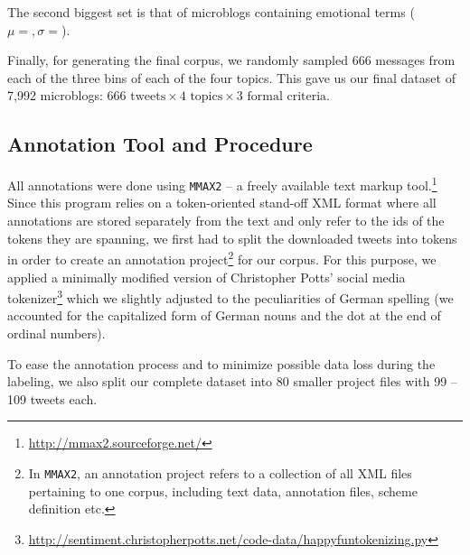 The second biggest set is that of microblogs containing emotional
terms ($\mu=, \sigma=$).

Finally, for generating the final corpus, we randomly sampled 666
messages from each of the three bins of each of the four topics. This
gave us our final dataset of 7,992 microblogs: $666\text{ tweets}
\times 4\text{ topics} \times 3\text{ formal criteria}$.

\subsection{Annotation Tool and Procedure}\label{subsec:snt:tformat}

All annotations were done using \texttt{MMAX2} -- a freely available
text markup tool.\footnote{\url{http://mmax2.sourceforge.net/}} Since
this program relies on a token-oriented stand-off XML format where all
annotations are stored separately from the text and only refer to the
ids of the tokens they are spanning, we first had to split the
downloaded tweets into tokens in order to create an annotation
project\footnote{In \texttt{MMAX2}, an annotation project refers to a
  collection of all XML files pertaining to one corpus, including text
  data, annotation files, scheme definition etc.}  for our corpus.
For this purpose, we applied a minimally modified version of
Christopher Potts' social media
tokenizer\footnote{\url{http://sentiment.christopherpotts.net/code-data/happyfuntokenizing.py}}
which we slightly adjusted to the peculiarities of German spelling (we
accounted for the capitalized form of German nouns and the dot at the
end of ordinal numbers).

To ease the annotation process and to minimize possible data loss
during the labeling, we also split our complete dataset into 80
smaller project files with 99 -- 109 tweets each.



